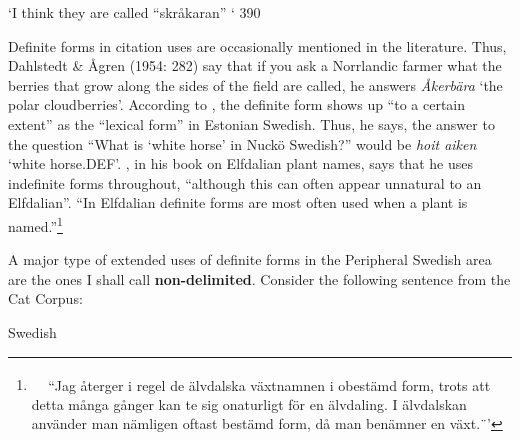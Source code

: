 \begin{styleTranslation}
‘I think they are called “skråkaran” ‘ 390

\end{styleTranslation}

\begin{styleBodyTextFirst}
Definite forms in citation uses are occasionally mentioned in the literature. Thus, Dahlstedt \& Ågren (1954: 282) say that if you ask a Norrlandic farmer what the berries that grow along the sides of the field are called, he answers \textit{Åkerbära} ‘the polar cloudberries’. According to \citet[82]{Lagman1979}, the definite form shows up “to a certain extent” as the “lexical form” in Estonian Swedish. Thus, he says, the answer to the question “What is ‘white horse’ in Nuckö Swedish?” would be \textit{hoit aiken} ‘white horse.DEF’. \citet[8]{Steensland1994}, in his book on Elfdalian plant names, says that he uses indefinite forms throughout, “although this can often appear unnatural to an Elfdalian”.  “In Elfdalian definite forms are most often used when a plant is named.”\footnote{\textsuperscript{\ \ } “Jag återger i regel de älvdalska växtnamnen i obestämd form, trots att detta många gånger kan te sig onaturligt för en älvdaling. I älvdalskan använder man nämligen oftast bestämd form, då man benämner en växt.¨’}

\end{styleBodyTextFirst}

\label{bkm:Ref105226557}
\begin{styleBodyTextFirst}
A major type of extended uses of definite forms in the Peripheral Swedish area are the ones I shall call \textbf{non-delimited}. Consider the following sentence from the Cat Corpus: 

\end{styleBodyTextFirst}

\begin{listWWNumileveli}
\item {}

\end{listWWNumileveli}

\begin{listWWNumxxiileveli}
\item {}

\begin{styleExLtrTbl}
Swedish

\end{styleExLtrTbl}

\end{listWWNumxxiileveli}

